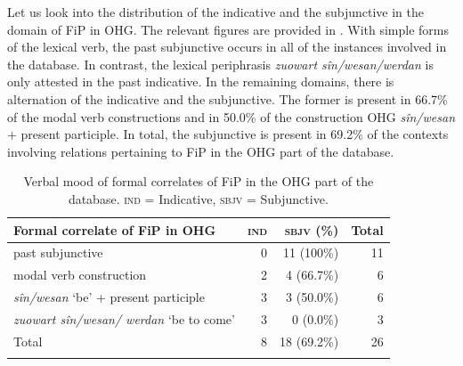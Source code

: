 \documentclass[output=paper,colorlinks,citecolor=brown]{langscibook}
\begin{document}
Let us look into the distribution of the indicative and the subjunctive in the domain of FiP in OHG. The relevant figures are provided in . With simple forms of the lexical verb, the past subjunctive occurs in all of the instances involved in the database. In contrast, the lexical periphrasis \textit{zuowart sîn/wesan/werdan} is only attested in the past indicative. In the remaining domains, there is alternation of the indicative and the subjunctive. The former is present in 66.7\% of the modal verb constructions and in 50.0\% of the construction OHG \textit{sîn/wesan} + present participle. In total, the subjunctive is present in 69.2\% of the contexts involving relations pertaining to FiP in the OHG part of the database.

\begin{table}%
    \centering
    \begin{tabularx}{\textwidth}{Qrrr}
        \lsptoprule
        {Formal correlate of FiP in OHG} & {\textsc{ind}} & {\textsc{sbjv} (\%)} & {Total} \\
        \midrule
        past subjunctive & 0 & 11 (100\%) & 11 \\
        modal verb construction & 2 & 4 (66.7\%) & 6 \\
        \textit{sîn/wesan} ‘be’ + present participle & 3 & 3 (50.0\%) & 6 \\
        \textit{zuowart sîn/wesan/ werdan} ‘be to come’ & 3 & 0 (0.0\%) & 3 \\
        \midrule
        {Total} & 8 & 18 (69.2\%) & 26 \\
        \lspbottomrule
    \end{tabularx}
    \caption{Verbal mood of formal correlates of FiP in the OHG part of the database. \textsc{ind} = Indicative, \textsc{sbjv} = Subjunctive.}
    \label{tab:3}
\end{table}
\end{document}
